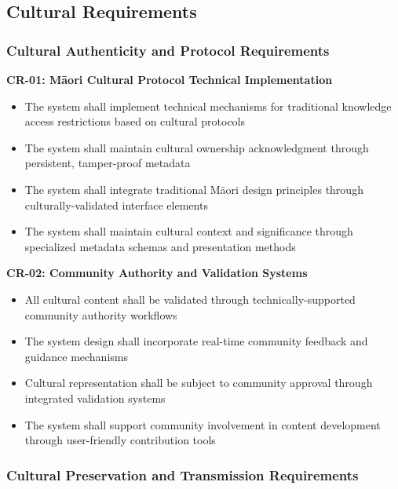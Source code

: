 \subsection{Cultural Requirements}
\label{subsec:cultural_requirements}

\subsubsection{Cultural Authenticity and Protocol Requirements}
\label{subsubsec:cultural_authenticity}

\textbf{CR-01: M\=aori Cultural Protocol Technical Implementation}
\begin{itemize}
    \item The system shall implement technical mechanisms for traditional knowledge access restrictions based on cultural protocols
    \item The system shall maintain cultural ownership acknowledgment through persistent, tamper-proof metadata
    \item The system shall integrate traditional M\=aori design principles through culturally-validated interface elements
    \item The system shall maintain cultural context and significance through specialized metadata schemas and presentation methods
\end{itemize}

\textbf{CR-02: Community Authority and Validation Systems}
\begin{itemize}
    \item All cultural content shall be validated through technically-supported community authority workflows
    \item The system design shall incorporate real-time community feedback and guidance mechanisms
    \item Cultural representation shall be subject to community approval through integrated validation systems
    \item The system shall support community involvement in content development through user-friendly contribution tools
\end{itemize}

\subsubsection{Cultural Preservation and Transmission Requirements}
\label{subsubsec:cultural_preservation}

